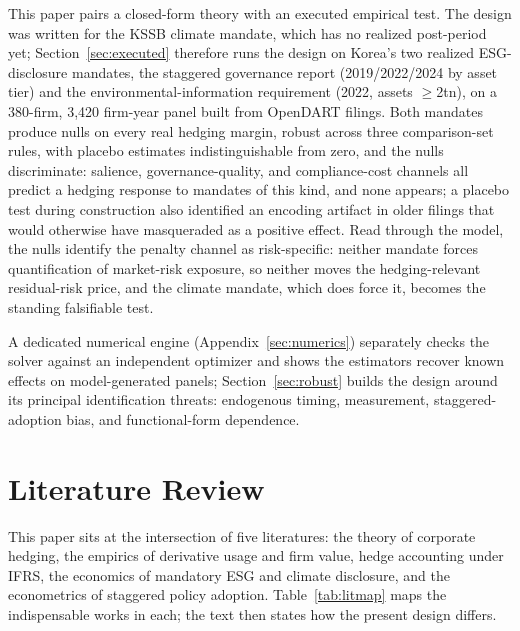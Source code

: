 \documentclass[11pt,a4paper]{article}
\begin{document}
This paper pairs a closed-form theory with an executed empirical test. The design was written for the KSSB climate mandate, which has no realized post-period yet; Section~\ref{sec:executed} therefore runs the design on Korea's two realized ESG-disclosure mandates, the staggered governance report (2019/2022/2024 by asset tier) and the environmental-information requirement (2022, assets $\ge$2tn), on a 380-firm, 3{,}420 firm-year panel built from OpenDART filings. Both mandates produce nulls on every real hedging margin, robust across three comparison-set rules, with placebo estimates indistinguishable from zero, and the nulls discriminate: salience, governance-quality, and compliance-cost channels all predict a hedging response to mandates of this kind, and none appears; a placebo test during construction also identified an encoding artifact in older filings that would otherwise have masqueraded as a positive effect. Read through the model, the nulls identify the penalty channel as risk-specific: neither mandate forces quantification of market-risk exposure, so neither moves the hedging-relevant residual-risk price, and the climate mandate, which does force it, becomes the standing falsifiable test.

A dedicated numerical engine (Appendix~\ref{sec:numerics}) separately checks the solver against an independent optimizer and shows the estimators recover known effects on model-generated panels; Section~\ref{sec:robust} builds the design around its principal identification threats: endogenous timing, measurement, staggered-adoption bias, and functional-form dependence.

\section{Literature Review}
\label{sec:lit}

This paper sits at the intersection of five literatures: the theory of corporate hedging, the empirics of derivative usage and firm value, hedge accounting under IFRS, the economics of mandatory ESG and climate disclosure, and the econometrics of staggered policy adoption. Table~\ref{tab:litmap} maps the indispensable works in each; the text then states how the present design differs.
\end{document}
